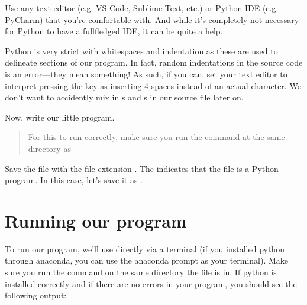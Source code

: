\documentclass[letterpaper,10pt,english]{jupyterBook}
\begin{document}
\sphinxAtStartPar
Use any text editor (e.g. VS Code, Sublime Text, etc.) or Python IDE (e.g. PyCharm) that you’re comfortable with.
And while it’s completely not necessary for Python to have a full\sphinxhyphen{}fledged IDE, it can be quite a help.

\sphinxAtStartPar
Python is very strict with whitespaces and indentation as these are used to delineate sections of our program.
In fact, random indentations in the source code is an error—they mean something!
As such, if you can, set your text editor to interpret pressing the  key as inserting 4 spaces instead of an actual  character.
We don’t want to accidently mix in s and s in our source file later on.

\sphinxAtStartPar
Now, write our little program.

\begin{sphinxVerbatim}[commandchars=\\\{\}]
\end{sphinxVerbatim}

\sphinxAtStartPar
{}
\begin{quote}

\sphinxAtStartPar
For this to run correctly, make sure you run the command at the same directory as 
\end{quote}

\sphinxAtStartPar
Save the file with the file extension .
The  indicates that the file is a Python program.
In this case, let’s save it as .


\section{Running our program}
\label{\detokenize{first-program:running-our-program}}
\sphinxAtStartPar
To run our program, we’ll use  directly via a terminal (if you installed python through anaconda, you can use the anaconda prompt as your terminal). Make sure you run the command on the same directory the file  is in. If python is installed correctly and if there are no errors in your program, you should see the following output:
\end{document}
